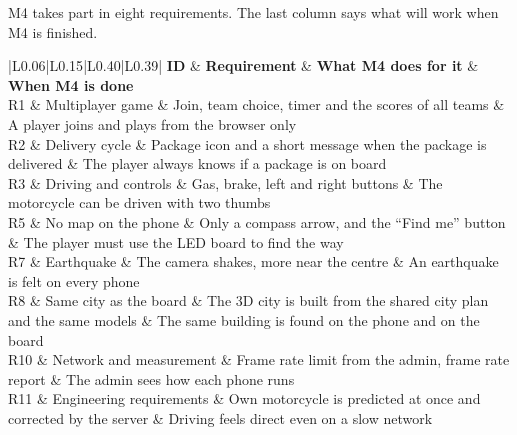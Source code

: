 \documentclass[
  english,
  10pt,
  a4paper,
]{article}
\newcommand{\ckkeep}[1]{\par\noindent\begin{minipage}{\linewidth}\setlength{\parskip}{4pt}#1\end{minipage}\par\smallskip}
\begin{document}

\ckkeep{%
M4 takes part in eight requirements. The last column says what will work when M4 is finished.

\begin{tabular}{|L{0.06}|L{0.15}|L{0.40}|L{0.39}|}
\hline \textbf{ID} & \textbf{Requirement} & \textbf{What M4 does for it} & \textbf{When M4 is done} \\ \hline 
R1 & Multiplayer game & Join, team choice, timer and the scores of all teams & A player joins and plays from the browser only \\ \hline
R2 & Delivery cycle & Package icon and a short message when the package is delivered & The player always knows if a package is on board \\ \hline
R3 & Driving and controls & Gas, brake, left and right buttons & The motorcycle can be driven with two thumbs \\ \hline
R5 & No map on the phone & Only a compass arrow, and the ``Find me'' button & The player must use the LED board to find the way \\ \hline
R7 & Earthquake & The camera shakes, more near the centre & An earthquake is felt on every phone \\ \hline
R8 & Same city as the board & The 3D city is built from the shared city plan and the same models & The same building is found on the phone and on the board \\ \hline
R10 & Network and measurement & Frame rate limit from the admin, frame rate report & The admin sees how each phone runs \\ \hline
R11 & Engineering requirements & Own motorcycle is predicted at once and corrected by the server & Driving feels direct even on a slow network \\ \hline
\end{tabular}}

\end{document}
